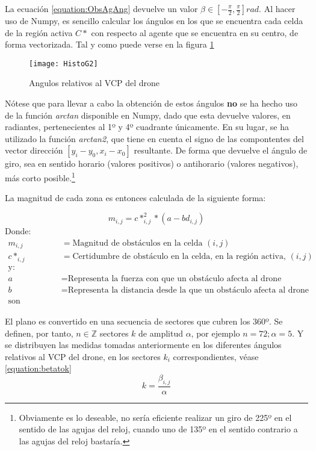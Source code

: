 La ecuación \ref{equation:ObsAgAng} devuelve un valor $\beta \in [-\frac{\pi}{2}, \frac{\pi}{2}]rad$. Al hacer uso de Numpy, es sencillo calcular los ángulos en los que se encuentra cada celda de la región activa $C*$ con respecto al agente que se encuentra en su centro, de forma vectorizada. Tal y como puede verse en la figura \ref{fig:histog2}
 \begin{figure}[H]
	\centering
	\texttt{[image: HistoG2]}
	\caption{Angulos relativos al VCP del drone}\label{fig:histog2}
\end{figure}

Nótese que para llevar a cabo la obtención de estos ángulos \textbf{no} se ha hecho uso de la función \textit{arctan} disponible en Numpy, dado que esta devuelve valores, en radiantes, pertenecientes al 1º y 4º cuadrante únicamente. En su lugar, se ha utilizado la función \textit{arctan2}, que tiene en cuenta el signo de las compontentes del vector dirección $ [y_i - y_0 , x_i - x_0]$ resultante.  De forma que devuelve el ángulo de giro, sea en sentido horario (valores positivos) o antihorario (valores negativos), más corto posible.\footnote{Obviamente es lo deseable, no sería eficiente realizar un giro de 225º en el sentido de las agujas del reloj, cuando uno de 135º en el sentido contrario a las agujas del reloj bastaría.} 


La magnitud de cada zona es entonces calculada de la siguiente forma:

\begin{equation}
\label{equation:mij}
m_{i,j} = c*_{i,j}^2 * (a-bd_{i,j})
\end{equation}
Donde: 
\begin{align*}
m_{i,j}  &= \text{Magnitud de obstáculos en la celda $(i,j)$}\\
c*_{i,j} &= \text{Certidumbre de obstáculo en la celda, en la región activa, $(i,j)$}\\
\text{y:} \\
a &= \text{Representa la fuerza con que un obstáculo afecta al drone}\\
b &= \text{Representa la distancia desde la que un obstáculo afecta al drone}\\
\text{son positivos}
\end{align*}

El plano es convertido en una secuencia de sectores que cubren los 360º. Se definen, por tanto, $n \in \mathbb{Z}$ sectores $k$ de amplitud $\alpha$, por ejemplo $n=72; \alpha=5$. Y se distribuyen las medidas tomadas anteriormente en los diferentes ángulos relativos al VCP del drone, en los sectores $k_i$ correspondientes, véase \ref{equation:betatok} 
\begin{equation}
\label{equation:betatok}
k =\frac{\beta_{i,j}}{\alpha}
\end{equation}

